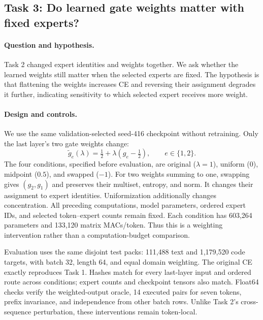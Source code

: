 \subsection{Task 3: Do learned gate weights matter with fixed experts?}
\label{sec:gate-investigation}
\paragraph{Question and hypothesis.}
Task 2 changed expert identities and weights together. We ask whether the learned
weights still matter when the selected experts are fixed. The hypothesis is that
flattening the weights increases CE and reversing their assignment degrades it
further, indicating sensitivity to which selected expert receives more weight.

\paragraph{Design and controls.}
We use the same validation-selected seed-416 checkpoint without retraining.
Only the last layer's two gate weights change:
\begin{equation}
\widetilde g_e(\lambda)=\tfrac12+\lambda(g_e-\tfrac12),\qquad e\in\{1,2\}.
\end{equation}
The four conditions, specified before evaluation, are original ($\lambda=1$),
uniform ($0$), midpoint ($0.5$), and swapped ($-1$). For two weights summing to
one, swapping gives $(g_2,g_1)$ and preserves their multiset, entropy, and norm.
It changes their assignment to expert identities. Uniformization additionally
changes concentration. All preceding computations, model parameters, ordered
expert IDs, and selected token--expert counts remain fixed. Each condition has
603,264 parameters and 133,120 matrix MACs/token. Thus this is a weighting
intervention rather than a computation-budget comparison.

Evaluation uses the same disjoint test packs: 111,488 text and 1,179,520 code
targets, with batch 32, length 64, and equal domain weighting. The original CE
exactly reproduces Task 1. Hashes match for every last-layer input and ordered
route across conditions; expert counts and checkpoint tensors also match.
Float64 checks verify the weighted-output oracle, 14 executed pairs for seven
tokens, prefix invariance, and independence from other batch rows. Unlike Task 2's
cross-sequence perturbation, these interventions remain token-local.



